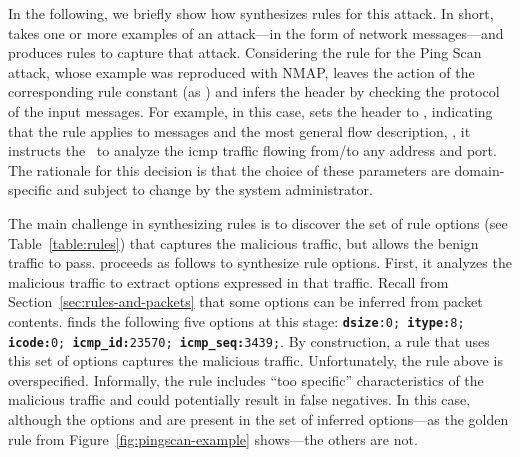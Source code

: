 \documentclass[sigconf,review, anonymous]{acmart}
\begin{document}
In the following, we briefly show how \tname{} synthesizes rules for
this attack. In short, \tname{} takes one or more examples of an
attack---in the form of network messages---and produces rules to
capture that attack. Considering the rule for the Ping Scan attack,
whose example was reproduced with NMAP, \tname{} leaves the action of
the corresponding rule constant (as ) and infers the
header by checking the protocol of the input messages. For example, in
this case, \tname{} sets the header to , indicating that the rule applies to  messages and
the most general flow description, \ie{}, it instructs the \nids\ to
analyze the icmp traffic flowing from/to any address and port.  The
rationale for this decision is that the choice of these parameters are
domain-specific and subject to change by the system administrator.

The main challenge in synthesizing rules is to discover the set of
rule options (see Table~\ref{table:rules}) that captures the malicious
traffic, but allows the benign traffic to pass. \tname{} proceeds as
follows to synthesize rule options. First, it analyzes the malicious
traffic to extract options expressed in that traffic. Recall from
Section~\ref{sec:rules-and-packets} that some options can be inferred
from packet contents. \tname{} finds the following five options at
this stage: {\scriptsize{\texttt{\textbf{dsize}:0; \textbf{itype:}8;
      \textbf{icode:}0; \textbf{icmp\_id:}23570;
      \textbf{icmp\_seq:}3439;}}}.  By construction, a rule that uses
this set of options captures the malicious traffic. Unfortunately, the
rule above is overspecified. Informally, the rule includes ``too
specific'' characteristics of the malicious traffic and could
potentially result in false negatives. In this case, although the
options  and  are present in the set
of inferred options---as the golden rule from
Figure~\ref{fig:pingscan-example} shows---the others are not.

\end{document}
